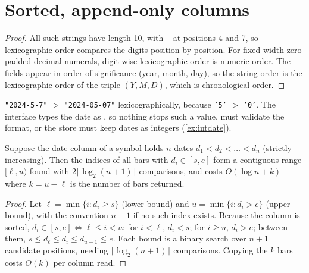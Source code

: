 \section{Sorted, append-only columns}
\begin{proof}
All such strings have length 10, with \texttt{-} at positions 4 and 7, so lexicographic order compares
the digits position by position. For fixed-width zero-padded decimal numerals, digit-wise lexicographic order is numeric
order. The fields appear in order of significance (year, month, day), so the string order is the lexicographic order
of the triple $(Y,M,D)$, which is chronological order.
\end{proof}

\begin{pitfall}[title={Pitfall: the lemma has hypotheses}]
\texttt{"2024-5-7"} $>$ \texttt{"2024-05-07"} lexicographically, because \texttt{'5'} $>$ \texttt{'0'}. The interface types the
date as , so nothing stops such a value.  must validate the format, or the store must keep
dates as integers (\cref{ex:intdate}).
\end{pitfall}

\begin{theorem}\label{thm:scan}
Suppose the date column of a symbol holds $n$ dates $d_1<d_2<\dots<d_n$ (strictly increasing). Then the indices of all
bars with $d_i\in[s,e]$ form a contiguous range $[\ell, u)$ found with $2\lceil\log_2(n+1)\rceil$ comparisons, and
 costs $O(\log n + k)$ where $k=u-\ell$ is the number of bars returned.
\end{theorem}
\begin{proof}
Let $\ell=\min\{i: d_i\ge s\}$ (lower bound) and $u=\min\{i: d_i> e\}$ (upper bound), with the convention $n+1$ if no
such index exists. Because the column is sorted, $d_i\in[s,e]\iff \ell\le i<u$: for $i<\ell$, $d_i<s$; for $i\ge u$,
$d_i>e$; between them, $s\le d_\ell\le d_i\le d_{u-1}\le e$. Each bound is a binary search over $n+1$ candidate
positions, needing $\lceil\log_2(n+1)\rceil$ comparisons. Copying the $k$ bars costs $O(k)$ per column read.
\end{proof}

